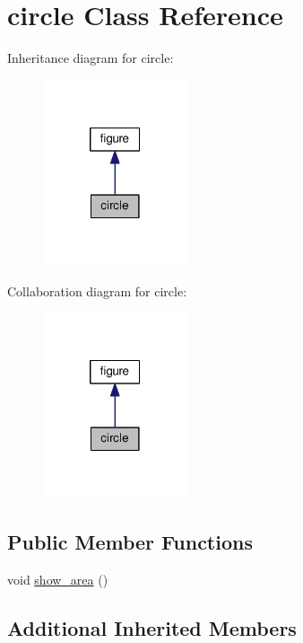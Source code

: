 \hypertarget{classcircle}{}\section{circle Class Reference}
\label{classcircle}


Inheritance diagram for circle\+:
\nopagebreak
\begin{figure}[H]
\begin{center}
\leavevmode
\includegraphics[width=121pt]{classcircle__inherit__graph}
\end{center}
\end{figure}


Collaboration diagram for circle\+:
\nopagebreak
\begin{figure}[H]
\begin{center}
\leavevmode
\includegraphics[width=121pt]{classcircle__coll__graph}
\end{center}
\end{figure}
\subsection*{Public Member Functions}
\begin{DoxyCompactItemize}
\item 
void \hyperlink{classcircle_aec30ad95a694a9f0f2cd149f38ae37ed}{show\+\_\+area} ()
\end{DoxyCompactItemize}
\subsection*{Additional Inherited Members}


